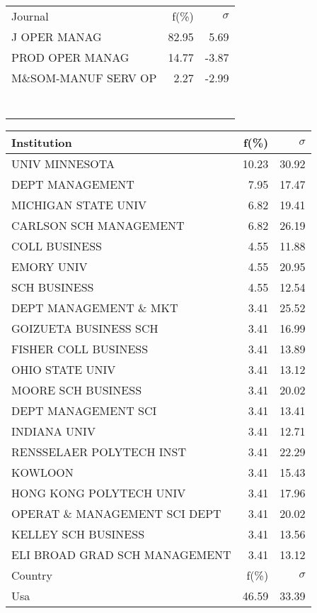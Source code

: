\documentclass[a4paper,11pt]{report}
\begin{document}
\begin{landscape}
\begin{table}[!ht]
{\begin{tabular}{|l r  r|}
 &  & \\
\hline
\hline
Journal & f(\%) & $\sigma$\\
\hline
J OPER MANAG & 82.95 & 5.69\\
PROD OPER MANAG & 14.77 & -3.87\\
M\&SOM-MANUF SERV OP & 2.27 & -2.99\\
 &  & \\
 &  & \\
 &  & \\
 &  & \\
 &  & \\
 &  & \\
 &  & \\
\hline
\end{tabular}
}
{\scriptsize\begin{tabular}{|l r r|}
\hline
Institution & f(\%) & $\sigma$\\
\hline
UNIV MINNESOTA & 10.23 & 30.92\\
DEPT MANAGEMENT & 7.95 & 17.47\\
MICHIGAN STATE UNIV & 6.82 & 19.41\\
CARLSON SCH MANAGEMENT & 6.82 & 26.19\\
COLL BUSINESS & 4.55 & 11.88\\
EMORY UNIV & 4.55 & 20.95\\
SCH BUSINESS & 4.55 & 12.54\\
DEPT MANAGEMENT \& MKT & 3.41 & 25.52\\
GOIZUETA BUSINESS SCH & 3.41 & 16.99\\
FISHER COLL BUSINESS & 3.41 & 13.89\\
OHIO STATE UNIV & 3.41 & 13.12\\
MOORE SCH BUSINESS & 3.41 & 20.02\\
DEPT MANAGEMENT SCI & 3.41 & 13.41\\
INDIANA UNIV & 3.41 & 12.71\\
RENSSELAER POLYTECH INST & 3.41 & 22.29\\
KOWLOON & 3.41 & 15.43\\
HONG KONG POLYTECH UNIV & 3.41 & 17.96\\
OPERAT \& MANAGEMENT SCI DEPT & 3.41 & 20.02\\
KELLEY SCH BUSINESS & 3.41 & 13.56\\
ELI BROAD GRAD SCH MANAGEMENT & 3.41 & 13.12\\
\hline
\hline
Country & f(\%) & $\sigma$\\
\hline
Usa & 46.59 & 33.39\\

\end{tabular}}
\end{table}
\end{landscape}
\end{document}
